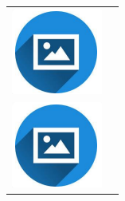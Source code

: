 \documentclass{article}
\begin{document}
\begin{paracol}{2}
\begin{tabular}{@{}ll}
         \begin{minipage}{0.09\linewidth}
         \includegraphics[width=\linewidth]{picon.png}
         \end{minipage} & {\color{maincolor}{skills.0}} \\[8pt]
         \begin{minipage}{0.09\linewidth}
         \includegraphics[width=\linewidth]{picon.png}

\end{minipage}
\end{tabular}
\end{paracol}
\end{document}
